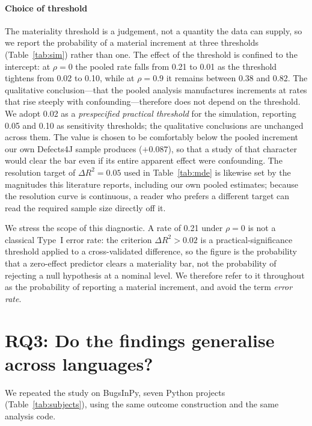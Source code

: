 \documentclass[preprint,12pt]{elsarticle}
\begin{document}
\paragraph{Choice of threshold} The materiality threshold is a judgement,
not a quantity the data can supply, so we report the probability of a material increment at three thresholds (Table~\ref{tab:sim}) rather than one. The effect of the
threshold is confined to the intercept: at $\rho = 0$ the pooled rate
falls from 0.21 to 0.01 as the threshold tightens from 0.02 to 0.10, while
at $\rho = 0.9$ it remains between 0.38 and 0.82. The qualitative
conclusion---that the pooled analysis manufactures increments at rates
that rise steeply with confounding---therefore does not depend on the
threshold. We adopt 0.02 as a \emph{prespecified practical threshold} for the
simulation, reporting 0.05 and 0.10 as sensitivity thresholds; the
qualitative conclusions are unchanged across them. The value is chosen to
be comfortably below the pooled increment our own Defects4J
sample produces ($+0.087$), so that a study of that character would clear
the bar even if its entire apparent effect were confounding. The resolution target of $\Delta R^2 = 0.05$ used in
Table~\ref{tab:mde} is likewise set by the magnitudes this literature
reports, including our own pooled estimates; because the resolution curve
is continuous, a reader who prefers a different target can read the
required sample size directly off it.

We stress the scope of this diagnostic. A rate of 0.21 under
$\rho = 0$ is not a classical Type~I error rate: the criterion
$\Delta R^2 > 0.02$ is a practical-significance threshold applied to a
cross-validated difference, so the figure is the probability that a
zero-effect predictor clears a materiality bar, not the probability of
rejecting a null hypothesis at a nominal level. We therefore refer to it
throughout as the probability of reporting a material increment, and avoid
the term \emph{error rate}.

\section{RQ3: Do the findings generalise across languages?}
\label{sec:rq3}

We repeated the study on BugsInPy, seven Python projects
(Table~\ref{tab:subjects}), using the same outcome construction and the
same analysis code.
\end{document}
